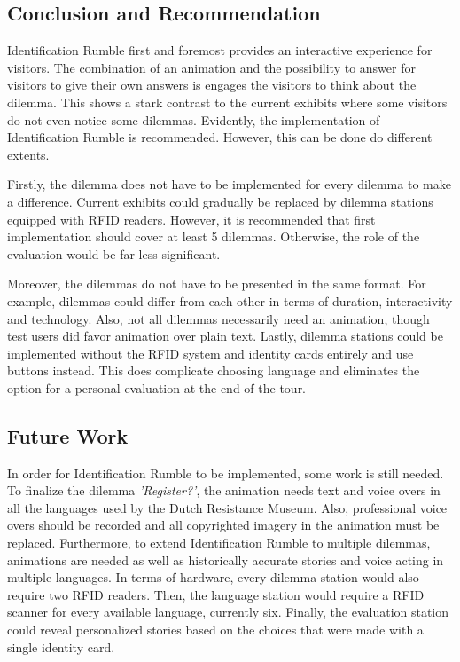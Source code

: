 \subsection{Conclusion and Recommendation}
Identification Rumble first and foremost provides an interactive experience for visitors. The combination of an animation and the possibility to answer for visitors to give their own answers is engages the visitors to think about the dilemma. This shows a stark contrast to the current exhibits where some visitors do not even notice some dilemmas. Evidently, the implementation of Identification Rumble is recommended. However, this can be done do different extents. 

Firstly, the dilemma does not have to be implemented for every dilemma to make a difference. Current exhibits could gradually be replaced by dilemma stations equipped with RFID readers. However, it is recommended that first implementation should cover at least 5 dilemmas. Otherwise, the role of the evaluation would be far less significant. 

Moreover, the dilemmas do not have to be presented in the same format. For example, dilemmas could differ from each other in terms of duration, interactivity and technology. Also, not all dilemmas necessarily need an animation, though test users did favor animation over plain text. 
Lastly, dilemma stations could be implemented without the RFID system and identity cards entirely and use buttons instead. This does complicate choosing language and eliminates the option for a personal evaluation at the end of the tour. 

\subsection{Future Work}
In order for Identification Rumble to be implemented, some work is still needed. 
To finalize the dilemma \textit{'Register?'}, the animation needs text and voice overs in all the languages used by the Dutch Resistance Museum. 
Also, professional voice overs should be recorded and all copyrighted imagery in the animation must be replaced. 
Furthermore, to extend Identification Rumble to multiple dilemmas, animations are needed as well as historically accurate stories and voice acting in multiple languages. 
In terms of hardware, every dilemma station would also require two RFID readers. 
Then, the language station would require a RFID scanner for every available language, currently six. 
Finally, the evaluation station could reveal personalized stories based on the choices that were made with a single identity card. 

